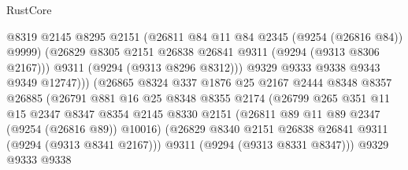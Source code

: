 \begin{lexlean}{RustCore}
\begin{coremodule}
                                    @8319
                                    @2145
                                    @8295
                                    @2151
                                    (@26811 @84 @11 @84 @2345 (@9254 (@26816 @84)) @9999)
                                    (@26829
                                      @8305
                                      @2151
                                      @26838
                                      @26841
                                      @9311
                                      (@9294 (@9313 @8306 @2167)))
                                    @9311
                                    (@9294 (@9313 @8296 @8312)))
                                  @9329
                                  @9333
                                  @9338
                                  @9343
                                  @9349
                                  @12747)))
                            (@26865
                              @8324
                              @337
                              @1876
                              @25
                              @2167
                              @2444
                              @8348
                              @8357
                              @26885
                              (@26791
                                @881
                                @16
                                @25
                                @8348
                                @8355
                                @2174
                                (@26799
                                  @265
                                  @351
                                  @11
                                  @15
                                  @2347
                                  @8347
                                  @8354
                                  @2145
                                  @8330
                                  @2151
                                  (@26811 @89 @11 @89 @2347 (@9254 (@26816 @89)) @10016)
                                  (@26829
                                    @8340
                                    @2151
                                    @26838
                                    @26841
                                    @9311
                                    (@9294 (@9313 @8341 @2167)))
                                  @9311
                                  (@9294 (@9313 @8331 @8347)))
                                @9329
                                @9333
                                @9338

\end{coremodule}
\end{lexlean}
